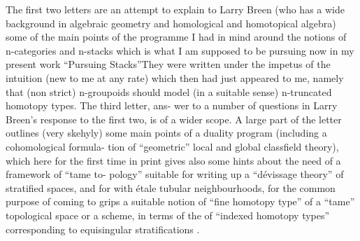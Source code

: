 The first two letters are an attempt to explain to Larry Breen (who
has a wide background in algebraic geometry and homological and homotopical
algebra) some of the main points of the programme I had in mind around the
notions of n-categories and n-stacks \hand{(}which is what I am supposed to be
pursuing now in my present work ``Pursuing Stacks''They were written under
the impetus of the intuition  (new to me at any rate) which then had
just appeared to me, namely that (non strict) n-groupoids should model
\margin{//}(in a suitable sense) n-truncated homotopy types.\hand{//} The third letter, ans-%
wer to a number of questions in Larry Breen's response to the first two,
is of a wider scope. A large part of the letter outlines (very skehyly)
some main points of a duality program (including a cohomological formula-%
tion of ``geometric'' local and global classfield theory), which 
here for the first time in print\hand{,}   gives also some hints about the need of a framework of ``tame to-%
pology'' suitable for writing up a ``dévissage theory'' of stratified spaces,
and for  with étale tubular neighbourhoods, for the common purpose
of coming to grips  a suitable notion of ``fine\unsure{\hand{,}} homotopy type'' of a ``tame''
topological space or a scheme, in terms of the  of ``indexed
homotopy types'' corresponding to equisingular stratifications .

